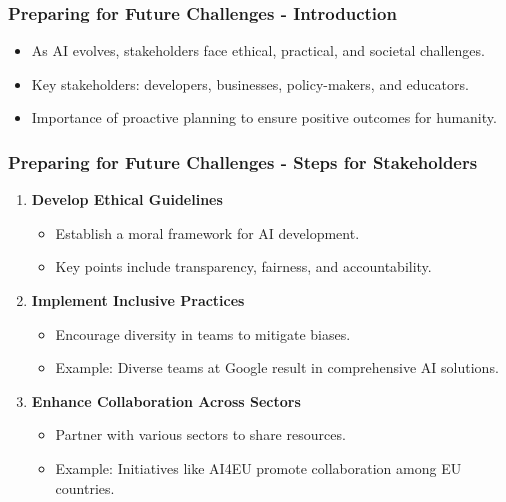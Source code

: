 \documentclass[aspectratio=169]{beamer}
\begin{document}
\begin{frame}[fragile]
    \frametitle{Preparing for Future Challenges - Introduction}
    \begin{itemize}
        \item As AI evolves, stakeholders face ethical, practical, and societal challenges.
        \item Key stakeholders: developers, businesses, policy-makers, and educators.
        \item Importance of proactive planning to ensure positive outcomes for humanity.
    \end{itemize}
\end{frame}

\begin{frame}[fragile]
    \frametitle{Preparing for Future Challenges - Steps for Stakeholders}
    \begin{enumerate}
        \item \textbf{Develop Ethical Guidelines}
            \begin{itemize}
                \item Establish a moral framework for AI development.
                \item Key points include transparency, fairness, and accountability.
            \end{itemize}
        
        \item \textbf{Implement Inclusive Practices}
            \begin{itemize}
                \item Encourage diversity in teams to mitigate biases.
                \item Example: Diverse teams at Google result in comprehensive AI solutions.
            \end{itemize}
        
        \item \textbf{Enhance Collaboration Across Sectors}
            \begin{itemize}
                \item Partner with various sectors to share resources.
                \item Example: Initiatives like AI4EU promote collaboration among EU countries.
            \end{itemize}
    \end{enumerate}
\end{frame}
\end{document}
